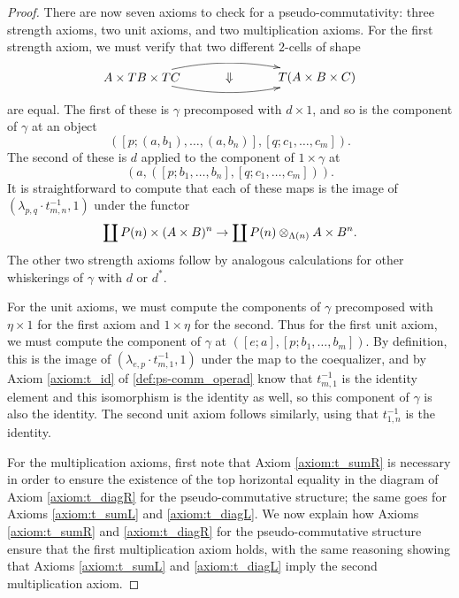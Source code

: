\begin{proof}
There are now seven axioms to check for a pseudo-commutativity:  three strength axioms, two unit axioms, and two multiplication axioms. For the first strength axiom, we must verify that two different $2$-cells of shape
  \[
    \xy
      (0,0)*+{A \times TB \times TC}="0";
      (50,0)*+{T(A \times B \times C)}="1";
      {\ar@/^1pc/ "0"; "1"};
      {\ar@/_1pc/ "0"; "1"};
      (25,0)*{\Downarrow}
    \endxy
  \]
are equal. The first of these is $\gamma$ precomposed with $d \times 1$, and so is the component of $\gamma$ at an object
  \[
    \left( [p;(a,b_1),\ldots,(a,b_n)], [q; c_{1}, \ldots, c_{m}] \right).
  \]
The second of these is $d$ applied to the component of $1 \times \gamma$ at
  \[
    \left(a, ([p;b_1,\ldots,b_n], [q; c_{1}, \ldots, c_{m}]) \right).
  \]
It is straightforward to compute that each of these maps is the image of $\left(\lambda_{p,q}\cdot t_{m,n}^{-1},1\right)$ under the functor
  \[
    \coprod P(n) \times (A \times B)^{n} \rightarrow \coprod P(n) \otimes_{\Lambda(n)} A \times B^{n}.
  \]
The other two strength axioms follow by analogous calculations for other whiskerings of $\gamma$ with $d$ or $d^{*}$.

For the unit axioms, we must compute the components of $\gamma$ precomposed with $\eta \times 1$ for the first axiom and $1 \times \eta$ for the second. Thus for the first unit axiom, we must compute the component of $\gamma$ at $\left( [e;a], [p; b_{1}, \ldots, b_{m}] \right)$. By definition, this is the image of $(\lambda_{e,p}\cdot t^{-1}_{m,1}, 1)$ under the map to the coequalizer, and by Axiom \ref{axiom:t_id} of \ref{def:ps-comm_operad} know that $t^{-1}_{m,1}$ is the identity element and this isomorphism is the identity as well, so this component of $\gamma$ is also the identity. The second unit axiom follows similarly, using that $t^{-1}_{1,n}$ is the identity.

For the multiplication axioms, first note that Axiom \ref{axiom:t_sumR} is necessary in order to ensure the existence of the top horizontal equality in the diagram of Axiom \ref{axiom:t_diagR} for the pseudo-commutative structure; the same goes for Axioms \ref{axiom:t_sumL} and \ref{axiom:t_diagL}. We now explain how Axioms \ref{axiom:t_sumR} and \ref{axiom:t_diagR} for the pseudo-commutative structure ensure that the first multiplication axiom holds, with the same reasoning showing that Axioms \ref{axiom:t_sumL} and \ref{axiom:t_diagL} imply the second multiplication axiom.


\end{proof}
